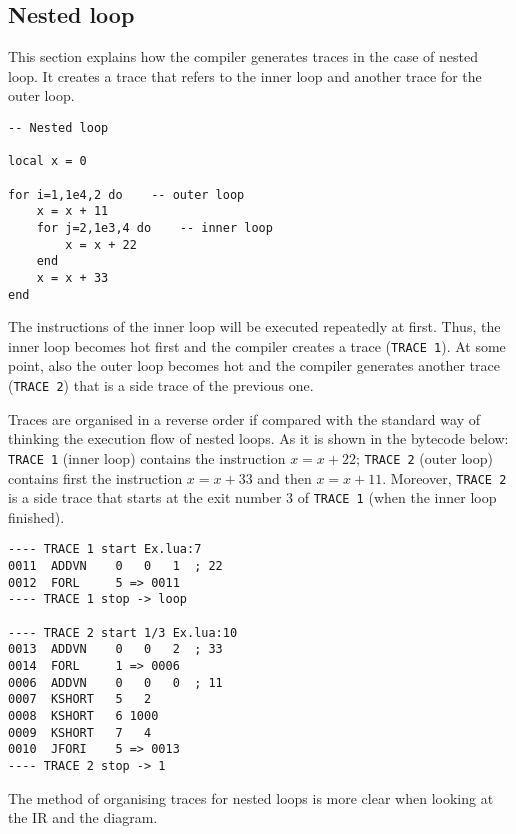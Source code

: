 \subsection{Nested loop}
\label{subsec:nested-loop}
This section explains how the compiler generates traces in the case of nested loop. It creates a trace that refers to the inner loop  and another trace for the outer loop.
\begin{mdframed}[style=LuaStyleFrame]
\begin{lstlisting}[style=LuaStyle]
-- Nested loop

local x = 0

for i=1,1e4,2 do    -- outer loop
    x = x + 11
    for j=2,1e3,4 do    -- inner loop
        x = x + 22
    end
    x = x + 33
end
\end{lstlisting}
\end{mdframed}

\noindent
The instructions of the inner loop will be executed repeatedly at first. Thus, the inner loop becomes hot first and the compiler creates a trace (\texttt{TRACE 1}). At some point, also the outer loop becomes hot and the compiler generates another trace (\texttt{TRACE 2}) that is a side trace of the previous one.

Traces are organised in a reverse order if compared with the standard way of thinking the execution flow of nested loops. As it is shown in the bytecode below: \texttt{TRACE 1} (inner loop) contains the instruction $x=x+22$;  \texttt{TRACE 2} (outer loop) contains first the instruction $x=x+33$ and then $x=x+11$. Moreover, \texttt{TRACE 2} is a side trace that starts at the exit number 3 of \texttt{TRACE 1} (when the inner loop finished).

\begin{multicols}{2}
\begin{lstlisting}[style=DumpStyle]
---- TRACE 1 start Ex.lua:7
0011  ADDVN    0   0   1  ; 22
0012  FORL     5 => 0011
---- TRACE 1 stop -> loop

---- TRACE 2 start 1/3 Ex.lua:10
0013  ADDVN    0   0   2  ; 33
0014  FORL     1 => 0006
0006  ADDVN    0   0   0  ; 11
0007  KSHORT   5   2
0008  KSHORT   6 1000
0009  KSHORT   7   4
0010  JFORI    5 => 0013
---- TRACE 2 stop -> 1
\end{lstlisting}
\end{multicols}

\noindent
The method of organising traces for nested loops is more clear when looking at the IR and the diagram.

